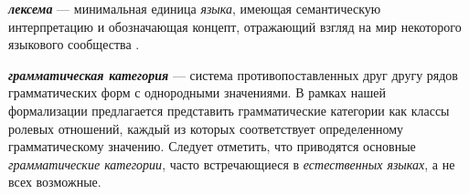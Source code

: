 \textbf{\textit{лексема}} --- минимальная единица \textit{языка}, имеющая семантическую интерпретацию и обозначающая концепт, отражающий взгляд на мир некоторого языкового сообщества .

\textbf{\textit{грамматическая категория}} --- система противопоставленных друг другу рядов грамматических форм с однородными значениями.
В рамках нашей формализации предлагается представить грамматические категории как классы ролевых отношений, каждый из которых соответствует определенному грамматическому значению.
Следует отметить, что приводятся основные \textit{грамматические категории}, часто встречающиеся в \textit{естественных языках}, а не всех возможные.

\begin{SCn}

    \begin{scnindent}
    \end{scnindent}
    \begin{scnindent}
    \end{scnindent}
    \begin{scnindent}
    \end{scnindent}
    \begin{scnindent}

\end{scnindent}
\end{SCn}
